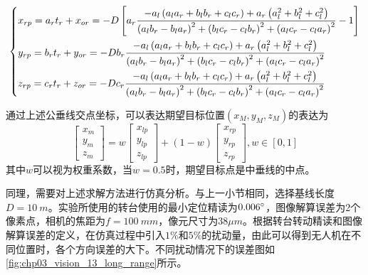 \begin{equation}
\left\{ \begin{gathered}
{x_{rp}} = {a_r}{t_r} + {x_{or}} =  - D\left[ {{a_r}\frac{{ - {a_l}\left( {{a_l}{a_r} + {b_l}{b_r} + {c_l}{c_r}} \right) + {a_r}\left( {a_l^2 + b_l^2 + c_l^2} \right)}}{{{{\left( {{a_l}{b_r} - {b_l}{a_r}} \right)}^2} + {{\left( {{b_l}{c_r} - {c_l}{b_r}} \right)}^2} + {{\left( {{a_l}{c_r} - {c_l}{a_r}} \right)}^2}}} - 1} \right] \hfill \\
{y_{rp}} = {b_r}{t_r} + {y_{or}} =  - D{b_r}\frac{{ - {a_l}\left( {{a_l}{a_r} + {b_l}{b_r} + {c_l}{c_r}} \right) + {a_r}\left( {a_l^2 + b_l^2 + c_l^2} \right)}}{{{{\left( {{a_l}{b_r} - {b_l}{a_r}} \right)}^2} + {{\left( {{b_l}{c_r} - {c_l}{b_r}} \right)}^2} + {{\left( {{a_l}{c_r} - {c_l}{a_r}} \right)}^2}}} \hfill \\
{z_{rp}} = {c_r}{t_r} + {z_{or}} =  - D{c_r}\frac{{ - {a_l}\left( {{a_l}{a_r} + {b_l}{b_r} + {c_l}{c_r}} \right) + {a_r}\left( {a_l^2 + b_l^2 + c_l^2} \right)}}{{{{\left( {{a_l}{b_r} - {b_l}{a_r}} \right)}^2} + {{\left( {{b_l}{c_r} - {c_l}{b_r}} \right)}^2} + {{\left( {{a_l}{c_r} - {c_l}{a_r}} \right)}^2}}} \hfill \\ 
\end{gathered}  \right.
\end{equation}

通过上述公垂线交点坐标，可以表达期望目标位置$(x_M, y_M, z_M)$的表达为
\begin{equation}
\left[ {\begin{array}{*{20}{c}}
	{{x_m}} \\ 
	{{y_m}} \\ 
	{{z_m}} 
	\end{array}} \right] = w\left[ {\begin{array}{*{20}{c}}
	{{x_{lp}}} \\ 
	{{y_{lp}}} \\ 
	{{z_{lp}}} 
	\end{array}} \right] + \left( {1 - w} \right)\left[ {\begin{array}{*{20}{c}}
	{{x_{rp}}} \\ 
	{{y_{rp}}} \\ 
	{{z_{rp}}} 
	\end{array}} \right],w \in [0,1]
\end{equation}
其中$w$可以视为权重系数，当$w=0.5$时，期望目标点是中垂线的中点。

同理，需要对上述求解方法进行仿真分析。与上一小节相同，选择基线长度$D=10\ m$。实验所使用的转台使用的最小定位精读为$0.006\degree$，图像解算误差为2个像素点，相机的焦距为$f=100\ mm$，像元尺寸为$38\mu m$。根据转台转动精读和图像解算误差的定义，在仿真过程中引入$1\%$和$5\%$的扰动量，由此可以得到无人机在不同位置时，各个方向误差的大下。不同扰动情况下的误差图如\ref{fig:chp03_vision_13_long_range}所示。

